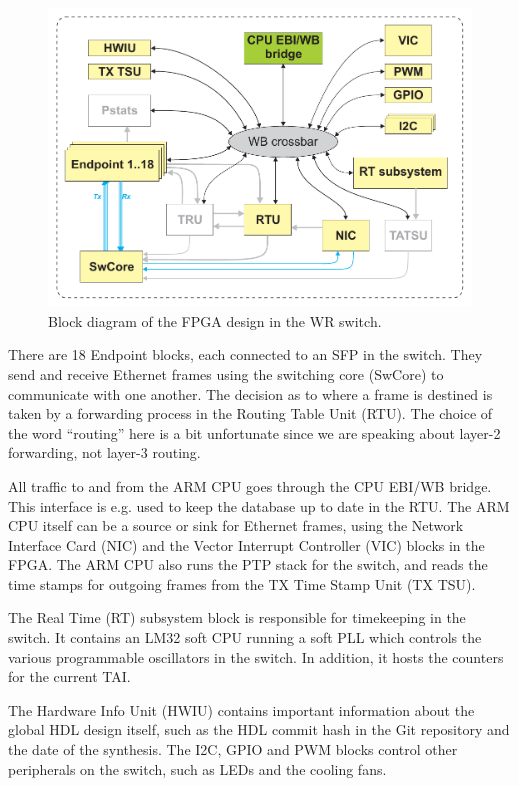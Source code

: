 \documentclass{../JAC2003}
\begin{document}
\begin{figure}[htb]
   \centering
   \includegraphics*[width=\columnwidth]{switch/switch_hdl_v3_3.pdf}
   \caption{Block diagram of the FPGA design in the WR switch.}
   \label{switch-fpga-fig}
\end{figure}

There are 18 Endpoint blocks, each connected to an SFP in the
switch. They send and receive Ethernet frames using the switching core
(SwCore) to communicate with one another. The decision as to where a
frame is destined is taken by a forwarding process in the Routing
Table Unit (RTU). The choice of the word ``routing'' here is a bit
unfortunate since we are speaking about layer-2 forwarding, not
layer-3 routing. 

All traffic to and from the ARM CPU goes through the CPU EBI/WB
bridge. This interface is e.g. used to keep the database up to date in
the RTU. The ARM CPU itself can be a source or sink for Ethernet
frames, using the Network Interface Card (NIC) and the Vector
Interrupt Controller (VIC) blocks in the FPGA. The ARM CPU also runs
the PTP stack for the switch, and reads the time stamps for outgoing
frames from the TX Time Stamp Unit (TX TSU).

The Real Time (RT) subsystem block is responsible for timekeeping in
the switch. It contains an LM32 soft CPU running a soft PLL which
controls the various programmable oscillators in the switch. In
addition, it hosts the counters for the current TAI.

The Hardware Info Unit (HWIU) contains important information about the
global HDL design itself, such as the HDL commit hash in the Git
repository and the date of the synthesis. The I2C, GPIO and PWM blocks
control other peripherals on the switch, such as LEDs and the cooling
fans. 
\end{document}
